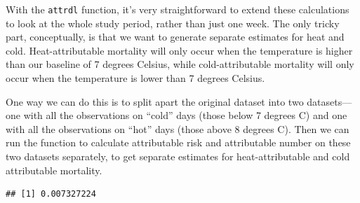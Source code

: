 \documentclass[
]{book}
\newenvironment{Shaded}{\begin{snugshade}}{\end{snugshade}}
\newcommand{\AttributeTok}[1]{\textcolor[rgb]{0.13,0.29,0.53}{#1}}
\newcommand{\CommentTok}[1]{\textcolor[rgb]{0.56,0.35,0.01}{\textit{#1}}}
\newcommand{\DecValTok}[1]{\textcolor[rgb]{0.00,0.00,0.81}{#1}}
\newcommand{\FunctionTok}[1]{\textcolor[rgb]{0.13,0.29,0.53}{\textbf{#1}}}
\newcommand{\NormalTok}[1]{#1}
\newcommand{\OtherTok}[1]{\textcolor[rgb]{0.56,0.35,0.01}{#1}}
\newcommand{\SpecialCharTok}[1]{\textcolor[rgb]{0.81,0.36,0.00}{\textbf{#1}}}
\newcommand{\StringTok}[1]{\textcolor[rgb]{0.31,0.60,0.02}{#1}}
\begin{document}
With the \texttt{attrdl} function, it's very straightforward to extend these calculations to look at the whole study period, rather than just one week. The only tricky part, conceptually, is that we want to generate separate estimates for heat and cold. Heat-attributable mortality will only occur when the temperature is higher than our baseline of 7 degrees Celsius, while cold-attributable mortality will only occur when the temperature is lower than 7 degrees Celsius.

One way we can do this is to split apart the original dataset into two datasets---one with all the observations on ``cold'' days (those below 7 degrees C) and one with all the observations on ``hot'' days (those above 8 degrees C). Then we can run the function to calculate attributable risk and attributable number on these two datasets separately, to get separate estimates for heat-attributable and cold attributable mortality.

\begin{Shaded}
\end{Shaded}

\begin{verbatim}
## [1] 0.007327224
\end{verbatim}

\begin{Shaded}
\end{Shaded}
\end{document}
